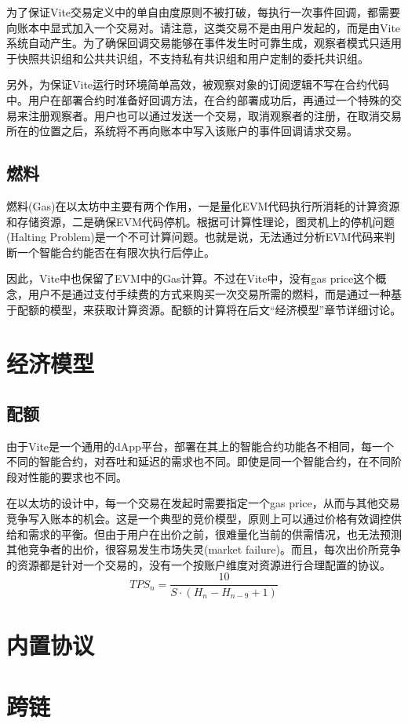 \documentclass[UTF8,nofonts]{ctexart}
\begin{document}
\begin{multicols}{2}
为了保证Vite交易定义中的单自由度原则不被打破，每执行一次事件回调，都需要向账本中显式加入一个交易对。请注意，这类交易不是由用户发起的，而是由Vite系统自动产生。为了确保回调交易能够在事件发生时可靠生成，观察者模式只适用于快照共识组和公共共识组，不支持私有共识组和用户定制的委托共识组。

另外，为保证Vite运行时环境简单高效，被观察对象的订阅逻辑不写在合约代码中。用户在部署合约时准备好回调方法，在合约部署成功后，再通过一个特殊的交易来注册观察者。用户也可以通过发送一个交易，取消观察者的注册，在取消交易所在的位置之后，系统将不再向账本中写入该账户的事件回调请求交易。

\subsection{燃料}
燃料(Gas)在以太坊中主要有两个作用，一是量化EVM代码执行所消耗的计算资源和存储资源，二是确保EVM代码停机。根据可计算性理论，图灵机上的停机问题(Halting Problem)是一个不可计算问题\cite{haltingproblems}。也就是说，无法通过分析EVM代码来判断一个智能合约能否在有限次执行后停止。

因此，Vite中也保留了EVM中的Gas计算。不过在Vite中，没有gas price这个概念，用户不是通过支付手续费的方式来购买一次交易所需的燃料，而是通过一种基于配额的模型，来获取计算资源。配额的计算将在后文“经济模型”章节详细讨论。

\section{经济模型}
\subsection{配额}
由于Vite是一个通用的dApp平台，部署在其上的智能合约功能各不相同，每一个不同的智能合约，对吞吐和延迟的需求也不同。即使是同一个智能合约，在不同阶段对性能的要求也不同。

在以太坊的设计中，每一个交易在发起时需要指定一个gas price，从而与其他交易竞争写入账本的机会。这是一个典型的竞价模型，原则上可以通过价格有效调控供给和需求的平衡。但由于用户在出价之前，很难量化当前的供需情况，也无法预测其他竞争者的出价，很容易发生市场失灵(market failure)。而且，每次出价所竞争的资源都是针对一个交易的，没有一个按账户维度对资源进行合理配置的协议。
$$
TPS_{n} =  \frac{10}{S\cdot(H_{n}  -  H_{n-9} + 1)}
$$
\section{内置协议}

\section{跨链}


\end{multicols}
\end{document}
